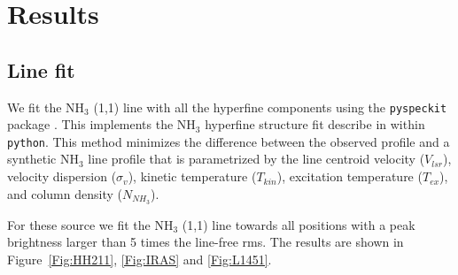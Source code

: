 \section{Results}

\subsection{Line fit}
We fit the NH$_3$ (1,1) line with all the hyperfine components using the \verb+pyspeckit+ package \cite{2011ascl.soft09001G}. 
This implements the NH$_3$ hyperfine structure fit describe in \cite{Rosolowsky_2008} within \verb+python+.
This method minimizes the difference between the observed profile and a synthetic NH$_3$ line profile 
that is parametrized by the line centroid velocity ($V_{lsr}$), velocity dispersion ($\sigma_v$), 
kinetic temperature ($T_{kin}$), excitation temperature ($T_{ex}$), and column density ($N_{NH_3}$).

For these source we fit the NH$_3$ (1,1) line towards all positions with a peak brightness larger than
5 times the line-free rms. 
The results are shown in Figure~\ref{Fig:HH211}, \ref{Fig:IRAS} and \ref{Fig:L1451}.